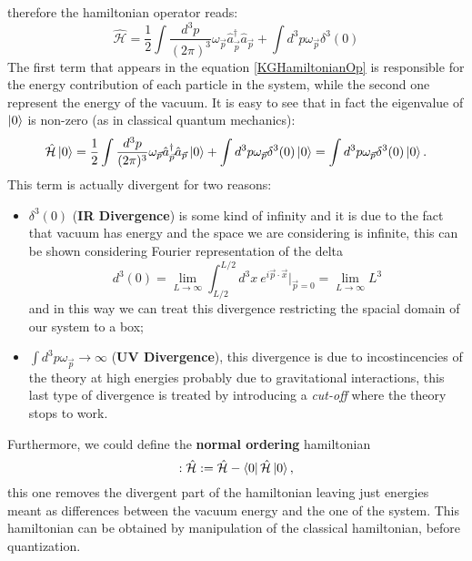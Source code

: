 therefore the hamiltonian operator reads:
\begin{equation}\label{KGHamiltonianOp}
    \hat{\mathcal{H} }=\frac{1}{2}\int\frac{d^3p}{(2\pi)^3}\omega_{\vec{p}}\hat{a}^\dagger_{\vec{p}}\hat{a}_{\vec{p}}+\int d^3p\omega_{\vec{p}}\delta^3(0)
\end{equation}
The first term that appears in the equation \eqref{KGHamiltonianOp} is responsible for the energy contribution of each particle in the system, while the second one represent the energy of the vacuum. It is easy to see that in fact the eigenvalue of $\ket{0}$ is non-zero (as in classical quantum mechanics):
\begin{equation*}
    \hat{\mathcal{H} }\ket{0}=\frac{1}{2}\int\frac{d^3p}{(2\pi)^3}\omega_{\vec{p}}\hat{a}^\dagger_{\vec{p}}\hat{a}_{\vec{p}}\ket{0}+\int d^3p\omega_{\vec{p}}\delta^3(0)\ket{0}=\int d^3p\omega_{\vec{p}}\delta^3(0)\ket{0}.
\end{equation*}   
This term is actually divergent for two reasons:
\begin{itemize}
    \item $\delta^3(0)$ (\textbf{IR Divergence}) is some kind of infinity and it is due to the fact that vacuum has energy and the space we are considering is infinite, this can be shown considering Fourier representation of the delta
    \begin{equation*}
        d^3(0)=\lim_{L\rightarrow\infty}\int_{L/2}^{L/2}d^3x\ e^{i\vec p\cdot\vec x}\bigg|_{\vec p=0}=\lim_{L\rightarrow\infty}L^3
    \end{equation*}
    and in this way we can treat this divergence restricting the spacial domain of our system to a box;
    \item $\int d^3p\omega_{\vec{p}}\rightarrow\infty$ (\textbf{UV Divergence}), this divergence is due to incostincencies of the theory at high energies probably due to gravitational interactions, this last type of divergence is treated by introducing a \emph{cut-off} where the theory stops to work. 
\end{itemize}
Furthermore, we could define the \textbf{normal ordering} hamiltonian
\begin{equation*}
    :\hat{\mathcal{H} }:=\hat{\mathcal{H} }-\bra{0}\hat{\mathcal{H}} \ket{0},
\end{equation*}
this one removes the divergent part of the hamiltonian leaving just energies meant as differences between the vacuum energy and the one of the system. This hamiltonian can be obtained by manipulation of the classical hamiltonian, before quantization.\\

